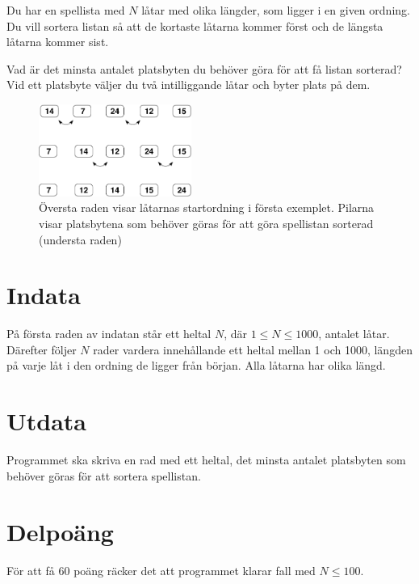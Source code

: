 
Du har en spellista med $N$ låtar med olika längder, som ligger i en given ordning. Du vill sortera listan så att de kortaste
låtarna kommer först och de längsta låtarna kommer sist.

Vad är det minsta antalet platsbyten du behöver göra för att få listan sorterad?
Vid ett platsbyte väljer du två intilliggande låtar och byter plats på
dem.

\begin{figure}[ht!]
\centering
\includegraphics[width=5cm]{sorterafig.pdf}
\caption{Översta raden visar låtarnas startordning i första exemplet. Pilarna visar platsbytena som behöver göras för att göra spellistan sorterad (understa raden)}
\end{figure}

\section*{Indata}

På första raden av indatan står ett heltal $N$, där $1\le N \le
1000$, antalet låtar. Därefter följer $N$ rader vardera innehållande ett heltal mellan 1 och 1000,
längden på varje låt i den ordning de ligger från början. Alla låtarna
har olika längd.

\section*{Utdata}

Programmet ska skriva en rad med ett heltal, det minsta antalet
platsbyten som behöver göras för att sortera spellistan.

\section*{Delpoäng}

För att få 60 poäng räcker det att programmet klarar fall med $N\le 100$.

